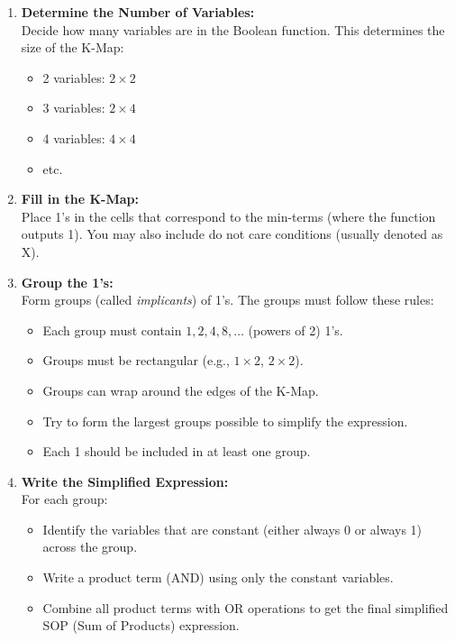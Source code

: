 \begin{enumerate}
	\item \textbf{Determine the Number of Variables:} \\
	      Decide how many variables are in the Boolean function. This determines the size of the K-Map:
	      \begin{itemize}
		      \item 2 variables: \(2 \times 2\)
		      \item 3 variables: \(2 \times 4\)
		      \item 4 variables: \(4 \times 4\)
		      \item etc.
	      \end{itemize}

	\item \textbf{Fill in the K-Map:} \\
	      Place 1's in the cells that correspond to the min-terms (where the function outputs 1). You may also include do not care conditions (usually denoted as \(\)X\(\)).

	\item \textbf{Group the 1's:} \\
	      Form groups (called \emph{implicants}) of 1's. The groups must follow these rules:
	      \begin{itemize}
		      \item Each group must contain \(1, 2, 4, 8, \ldots\) (powers of 2) 1's.
		      \item Groups must be rectangular (e.g., \(1 \times 2\), \(2 \times 2\)).
		      \item Groups can wrap around the edges of the K-Map.
		      \item Try to form the largest groups possible to simplify the expression.
		      \item Each 1 should be included in at least one group.
	      \end{itemize}

	\item \textbf{Write the Simplified Expression:} \\
	      For each group:
	      \begin{itemize}
		      \item Identify the variables that are constant (either always 0 or always 1) across the group.
		      \item Write a product term (AND) using only the constant variables.
		      \item Combine all product terms with OR operations to get the final simplified SOP (Sum of Products) expression.
	      \end{itemize}
\end{enumerate}

